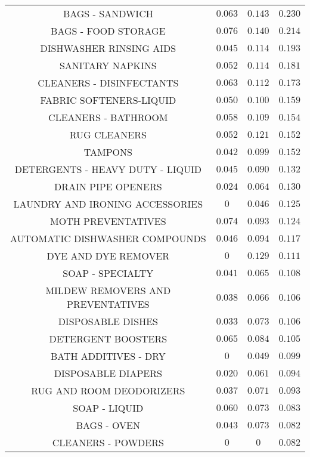 \begin{table}[!htbp]
{\begin{tabular}{@{\extracolsep{5pt}} cccc}
BAGS - SANDWICH                       & $0.063$ & $0.143$ & $0.230$ \\
BAGS - FOOD STORAGE                   & $0.076$ & $0.140$ & $0.214$ \\
DISHWASHER RINSING AIDS               & $0.045$ & $0.114$ & $0.193$ \\
SANITARY NAPKINS                      & $0.052$ & $0.114$ & $0.181$ \\
CLEANERS - DISINFECTANTS              & $0.063$ & $0.112$ & $0.173$ \\
FABRIC SOFTENERS-LIQUID               & $0.050$ & $0.100$ & $0.159$ \\
CLEANERS - BATHROOM                   & $0.058$ & $0.109$ & $0.154$ \\
RUG CLEANERS                          & $0.052$ & $0.121$ & $0.152$ \\
TAMPONS                               & $0.042$ & $0.099$ & $0.152$ \\
DETERGENTS - HEAVY DUTY - LIQUID      & $0.045$ & $0.090$ & $0.132$ \\
DRAIN PIPE OPENERS                    & $0.024$ & $0.064$ & $0.130$ \\
LAUNDRY AND IRONING ACCESSORIES       & $0$ & $0.046$ & $0.125$ \\
MOTH PREVENTATIVES                    & $0.074$ & $0.093$ & $0.124$ \\
AUTOMATIC DISHWASHER COMPOUNDS        & $0.046$ & $0.094$ & $0.117$ \\
DYE AND DYE REMOVER                   & $0$ & $0.129$ & $0.111$ \\
SOAP - SPECIALTY                      & $0.041$ & $0.065$ & $0.108$ \\
MILDEW REMOVERS AND PREVENTATIVES       & $0.038$ & $0.066$ & $0.106$ \\
DISPOSABLE DISHES & $0.033$ & $0.073$ & $0.106$ \\
DETERGENT BOOSTERS & $0.065$ & $0.084$ & $0.105$ \\
BATH ADDITIVES - DRY & $0$ & $0.049$ & $0.099$ \\
DISPOSABLE DIAPERS & $0.020$ & $0.061$ & $0.094$ \\
RUG AND ROOM DEODORIZERS & $0.037$ & $0.071$ & $0.093$ \\
SOAP - LIQUID & $0.060$ & $0.073$ & $0.083$ \\
BAGS - OVEN & $0.043$ & $0.073$ & $0.082$ \\
CLEANERS - POWDERS & $0$ & $0$ & $0.082$ \\

\end{tabular}}
\end{table}
